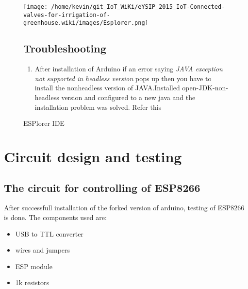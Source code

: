 \documentclass[16pt]{article}
\begin{document}
 \begin{figure}
\hspace{1cm}
\texttt{[image: /home/kevin/git\_IoT\_WiKi/eYSIP\_2015\_IoT-Connected-valves-for-irrigation-of-greenhouse.wiki/images/Esplorer.png]}
\caption{ESPlorer IDE}

\subsection{Troubleshooting}

\begin{enumerate}

\item
  After installation of Arduino if an error saying \emph{JAVA exception
  not supported in headless version} pops up then you have to install
  the nonheadless version of JAVA.Installed open-JDK-non-headless
  version and configured to a new java and the installation problem was
  solved. Refer this
\end{enumerate}

\end{figure}


\vspace{0.4cm}



\vspace{3.5cm}

\section{Circuit design and testing}



\subsection{The circuit for controlling of ESP8266}

\vspace{0.5cm}

After successfull installation of the forked version of arduino, testing
of ESP8266 is done. The components used are:

\begin{itemize}

\item
  USB to TTL converter
\item
  wires and jumpers
\item
  ESP module
\item
  1k resistors
\end{itemize}
\end{document}
